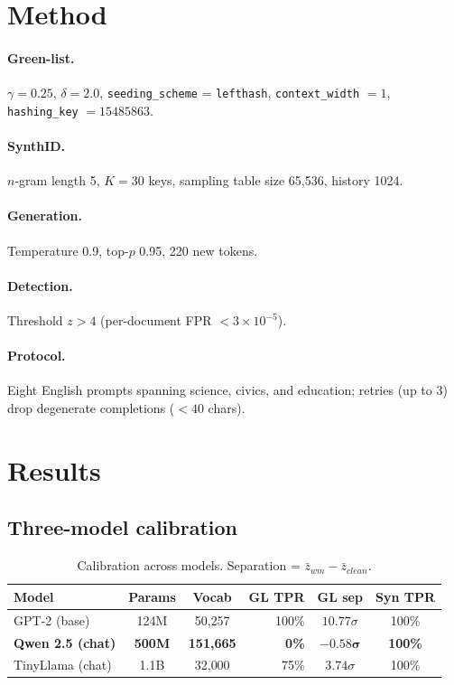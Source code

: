 \documentclass[11pt,a4paper]{article}
\begin{document}
\section{Method}
\paragraph{Green-list.} $\gamma = 0.25$, $\delta = 2.0$,
\texttt{seeding\_scheme} = \texttt{lefthash}, \texttt{context\_width}
$= 1$, \texttt{hashing\_key} $= 15485863$.
\paragraph{SynthID.} $n$-gram length 5, $K = 30$ keys, sampling table
size 65{,}536, history 1024.
\paragraph{Generation.} Temperature 0.9, top-$p$ 0.95, 220 new tokens.
\paragraph{Detection.} Threshold $z > 4$ (per-document FPR
$< 3 \times 10^{-5}$).
\paragraph{Protocol.} Eight English prompts spanning science, civics,
and education; retries (up to 3) drop degenerate completions
($< 40$ chars).

\section{Results}

\subsection{Three-model calibration}

\begin{table}[h]
\centering
\caption{Calibration across models. Separation = $\bar z_{wm} - \bar z_{clean}$.}
\label{tab:cal}
\begin{tabular}{lccrcc}
\toprule
Model & Params & Vocab & GL TPR & GL sep & Syn TPR \\
\midrule
GPT-2 (base)         & 124M & 50{,}257  & 100\%   & $10.77\sigma$ & 100\% \\
\textbf{Qwen 2.5 (chat)} & \textbf{500M} & \textbf{151{,}665} & \textbf{0\%}   & $\mathbf{-0.58\sigma}$ & \textbf{100\%} \\
TinyLlama (chat)     & 1.1B & 32{,}000  & 75\%    & $3.74\sigma$  & 100\% \\
\bottomrule
\end{tabular}
\end{table}
\end{document}
